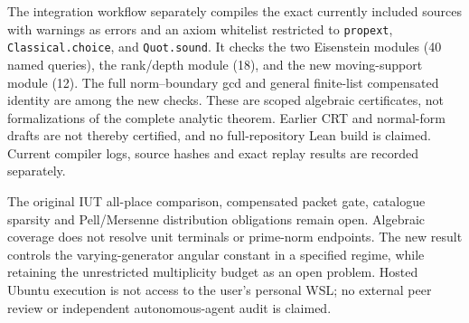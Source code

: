 The integration workflow separately compiles the exact currently included
sources with warnings as errors and an axiom whitelist restricted to
\texttt{propext}, \texttt{Classical.choice}, and \texttt{Quot.sound}.
It checks the two Eisenstein modules (40 named queries), the rank/depth
module (18), and the new moving-support module (12). The full norm--boundary
gcd and general finite-list compensated identity are among the new checks.
These are scoped algebraic certificates, not formalizations of the complete
analytic theorem. Earlier CRT and normal-form drafts are not thereby
certified, and no full-repository Lean build is claimed. Current compiler
logs, source hashes and exact replay results are recorded separately.

The original IUT all-place comparison, compensated packet gate, catalogue
sparsity and Pell/Mersenne distribution obligations remain open. Algebraic
coverage does not resolve unit terminals or prime-norm endpoints. The new
result controls the varying-generator angular constant in a specified
regime, while retaining the unrestricted multiplicity budget as an open
problem. Hosted Ubuntu execution is not access to the user's personal WSL;
no external peer review or independent autonomous-agent audit is claimed.
